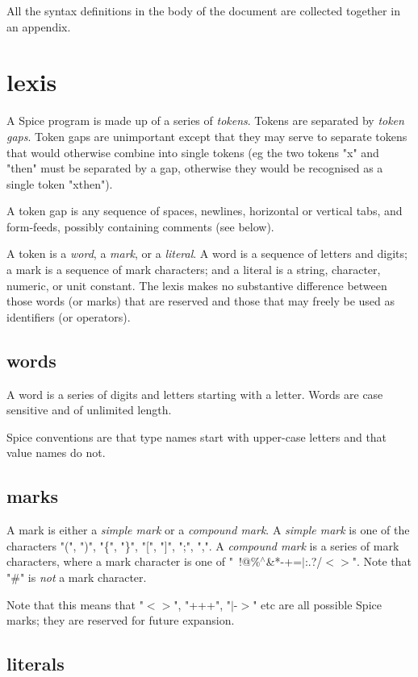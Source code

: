 \documentclass{report}
\begin{document}
All the syntax definitions in the body of the document are collected together
in an appendix.\chapter{lexis}


A Spice program is made up of a series of {\em tokens}. Tokens are
separated by {\em token gaps}. Token gaps are unimportant except that they
may serve to separate tokens that would otherwise combine into single
tokens (eg the two tokens "x" and "then" must be separated by a gap,
otherwise they would be recognised as a single token "xthen").

A token gap is any sequence of spaces, newlines, horizontal or
vertical tabs, and form-feeds, possibly containing comments (see below).

A token is a {\em word}, a {\em mark}, or a {\em literal}. A word is a sequence of
letters and digits; a mark is a sequence of mark characters; and a
literal is a string, character, numeric, or unit constant. The lexis
makes no substantive difference between those words (or marks) that
are reserved and those that may freely be used as identifiers (or
operators).

\section{words}


A word is a series of digits and letters starting with a letter. Words are
case sensitive and of unlimited length.

Spice conventions are that type names start with upper-case letters
and that value names do not.\section{marks}


A mark is either a {\em simple mark} or a {\em compound mark}. A {\em simple mark}
is one of the characters "(", ")", "\{", "\}", "{[}", "{]}", ";", ",". A
{\em compound mark} is a series of mark characters, where a mark character
is one of "~!@\%$^\wedge$\&*-+=$\mid$:.?/$<$$>$". Note that "\#" is {\em not} a mark
character.

Note that this means that "$<$$>$", "+++", "$\mid$-$>$" etc are all possible Spice
marks; they are reserved for future expansion.\section{literals}
\end{document}
